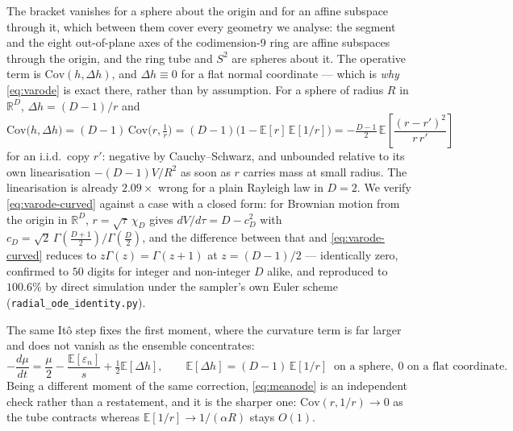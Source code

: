\documentclass[11pt]{article}
\theoremstyle{remark}
\newcommand{\eps}{\varepsilon}
\newcommand{\R}{\mathbb{R}}
\newcommand{\E}{\mathbb{E}}
\newcommand{\Cov}{\mathrm{Cov}}
\begin{document}
The bracket vanishes for a sphere about the origin and for an affine subspace through it,
which between them cover every geometry we analyse: the segment and the eight out-of-plane
axes of the codimension-9 ring are affine subspaces through the origin, and the ring tube
and $S^2$ are spheres about it. The operative term is $\Cov(h,\Delta h)$, and $\Delta h\equiv0$
for a flat normal coordinate --- which is \emph{why} \eqref{eq:varode} is exact there,
rather than by assumption. For a sphere of radius $R$ in $\R^D$, $\Delta h=(D-1)/r$ and
\begin{equation}
\Cov\big(h,\Delta h\big)=(D-1)\,\Cov\!\big(r,\tfrac1r\big)=(D-1)\big(1-\E[r]\,\E[1/r]\big)
=-\tfrac{D-1}{2}\,\E\!\left[\frac{(r-r')^2}{r\,r'}\right]
\label{eq:curvterm}
\end{equation}
for an i.i.d.\ copy $r'$: negative by Cauchy--Schwarz, and unbounded relative to its own
linearisation $-(D-1)V/R^2$ as soon as $r$ carries mass at small radius. The linearisation
is already $2.09\times$ wrong for a plain Rayleigh law in $D=2$. We verify
\eqref{eq:varode-curved} against a case with a closed form: for Brownian motion from the
origin in $\R^D$, $r=\sqrt\tau\,\chi_D$ gives $dV/d\tau=D-c_D^2$ with
$c_D=\sqrt2\,\Gamma(\tfrac{D+1}2)/\Gamma(\tfrac D2)$, and the difference between that and
\eqref{eq:varode-curved} reduces to $z\Gamma(z)=\Gamma(z+1)$ at $z=(D-1)/2$ --- identically
zero, confirmed to $50$ digits for integer and non-integer $D$ alike, and reproduced to
$100.6\%$ by direct simulation under the sampler's own Euler scheme
(\texttt{radial\_ode\_identity.py}).

The same It\^o step fixes the first moment, where the curvature term is far larger and does
not vanish as the ensemble concentrates:
\begin{equation}
-\frac{d\mu}{dt}=\frac{\mu}{2}-\frac{\E[\eps_n]}{s}+\tfrac12\E[\Delta h],
\qquad \E[\Delta h]=(D-1)\,\E[1/r] \ \text{ on a sphere},\ 0 \text{ on a flat coordinate.}
\label{eq:meanode}
\end{equation}
Being a different moment of the same correction, \eqref{eq:meanode} is an independent check
rather than a restatement, and it is the sharper one: $\Cov(r,1/r)\to0$ as the tube
contracts whereas $\E[1/r]\to1/(\alpha R)$ stays $O(1)$.
\end{document}
